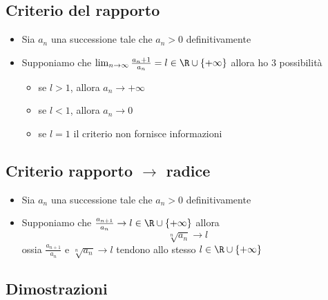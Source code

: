 \subsection{Criterio del rapporto}
\begin{itemize}
	\item Sia $a_n$ una successione tale che $a_n > 0$ definitivamente
	\item Supponiamo che $\lim_{n \to \infty} \frac{a_n+1}{a_n}=l \in  \R \cup    \left\{ +\infty \right\} $
	allora ho 3 possibilità
	\begin{itemize}
		\item se $l > 1$, allora $ a_n \to +\infty$
		\item se $l < 1$, allora $a_n \to 0$
		\item se  $l=1$ il criterio non fornisce informazioni 
	\end{itemize}
\end{itemize}
\subsection{Criterio rapporto $ \rightarrow $ radice}
\begin{itemize}
	\item Sia $a_n$ una successione tale che $a_n > 0 $ definitivamente
	\item Supponiamo che $\frac{a_{n + 1}}{a_n} \to l \in  \R \cup \left\{ +\infty \right\} $
allora
\[
\sqrt[n]{a_n} \to l
\] 
ossia $\frac{a_{n +1}}{a_n}$ e $\sqrt[n]{a_n} \to l$ tendono allo stesso $l \in \R \cup \left\{ +\infty \right\} $
\end{itemize}
\subsection{Dimostrazioni}
